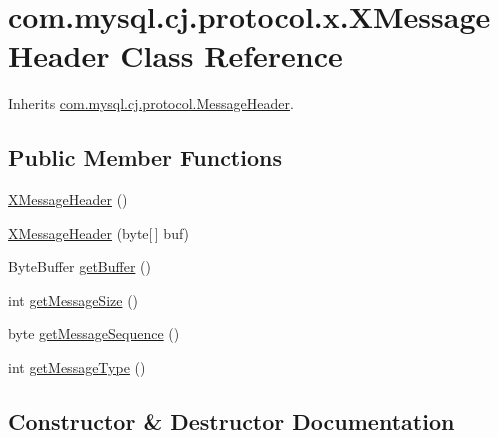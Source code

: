 \hypertarget{classcom_1_1mysql_1_1cj_1_1protocol_1_1x_1_1_x_message_header}{}\section{com.\+mysql.\+cj.\+protocol.\+x.\+X\+Message\+Header Class Reference}
\label{classcom_1_1mysql_1_1cj_1_1protocol_1_1x_1_1_x_message_header}


Inherits \mbox{\hyperlink{interfacecom_1_1mysql_1_1cj_1_1protocol_1_1_message_header}{com.\+mysql.\+cj.\+protocol.\+Message\+Header}}.

\subsection*{Public Member Functions}
\begin{DoxyCompactItemize}
\item 
\mbox{\hyperlink{classcom_1_1mysql_1_1cj_1_1protocol_1_1x_1_1_x_message_header_a5672aaf1c88155df53142773b7ce49a2}{X\+Message\+Header}} ()
\item 
\mbox{\hyperlink{classcom_1_1mysql_1_1cj_1_1protocol_1_1x_1_1_x_message_header_aa60831715b293388c3b5767aa69f714c}{X\+Message\+Header}} (byte\mbox{[}$\,$\mbox{]} buf)
\item 
Byte\+Buffer \mbox{\hyperlink{classcom_1_1mysql_1_1cj_1_1protocol_1_1x_1_1_x_message_header_a5afa56bd029e353dd7f93b86e43a692f}{get\+Buffer}} ()
\item 
int \mbox{\hyperlink{classcom_1_1mysql_1_1cj_1_1protocol_1_1x_1_1_x_message_header_a7a585e24fbcd4364793244041eb81dcd}{get\+Message\+Size}} ()
\item 
byte \mbox{\hyperlink{classcom_1_1mysql_1_1cj_1_1protocol_1_1x_1_1_x_message_header_abfa0f85a9c79c4b91d062b6bf8e52d8b}{get\+Message\+Sequence}} ()
\item 
int \mbox{\hyperlink{classcom_1_1mysql_1_1cj_1_1protocol_1_1x_1_1_x_message_header_a97ea98c4f2519880ea76fc4698e9e99d}{get\+Message\+Type}} ()
\end{DoxyCompactItemize}


\subsection{Constructor \& Destructor Documentation}
\mbox{\label{classcom_1_1mysql_1_1cj_1_1protocol_1_1x_1_1_x_message_header_a5672aaf1c88155df53142773b7ce49a2}} 
